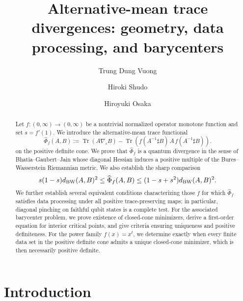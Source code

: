 \documentclass[11pt]{amsart}
\title[Alternative-mean trace divergences]
{Alternative-mean trace divergences: geometry, data processing,
	and barycenters}
\author{Trung Dung Vuong}
\author{Hiroki Shudo}
\author{Hiroyuki Osaka }
\theoremstyle{definition}
\theoremstyle{remark}
\newcommand{\Tr}{\operatorname{Tr}}
\newcommand{\altPhi}{\widehat{\Phi}}
\begin{document}
	
\begin{abstract}
	Let $f:(0,\infty)\to(0,\infty)$ be a nontrivial normalized operator
	monotone function and set $s=f'(1)$. We introduce the alternative-mean
	trace functional
\[
\altPhi_f(A,B)
:=\Tr(A\nabla_s B)
-\Tr\!\left(
f(A^{-1}\sharp B)\,A\,f(A^{-1}\sharp B)
\right).
\]
	on the positive definite cone. We prove that $\altPhi_f$ is a quantum divergence in the sense of
	Bhatia--Gaubert--Jain whose diagonal Hessian induces a positive multiple
	of the Bures--Wasserstein Riemannian metric. We also establish the sharp
	comparison
	\[
	s(1-s)d_{\rm BW}(A,B)^2
	\le \altPhi_f(A,B)
	\le (1-s+s^2)d_{\rm BW}(A,B)^2.
	\] We further establish several equivalent conditions characterizing those
	$f$ for which $\altPhi_f$ satisfies data processing under all positive
	trace-preserving maps; in particular, diagonal pinching on faithful qubit
	states is a complete test. For the associated barycenter problem, we prove
	existence of closed-cone minimizers, derive a first-order equation for
	interior critical points, and give criteria ensuring uniqueness and positive
	definiteness. For the power family $f(x)=x^t$, we determine exactly when
	every finite data set in the positive definite cone admits a unique
	closed-cone minimizer, which is then necessarily positive definite.
\end{abstract}

	
	\maketitle
	
	\section{Introduction}
	
\end{document}
